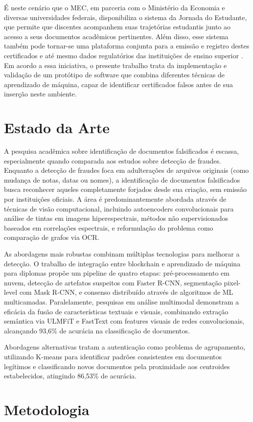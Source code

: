 \documentclass[12pt]{article}
\begin{document}
É neste cenário que o MEC, em parceria com o Ministério da Economia e diversas universidades federais, disponibiliza o sistema da Jornada do Estudante, que permite que discentes acompanhem suas trajetórias estudantis junto ao acesso a seus documentos acadêmicos pertinentes. Além disso, esse sistema também pode tornar-se uma plataforma conjunta para a emissão e registro destes certificados e até mesmo dados regulatórios das instituições de ensino superior \cite{rnp:2023}. Em acordo a essa iniciativa, o presente trabalho trata da implementação e validação de um protótipo de software que combina diferentes técnicas de aprendizado de máquina, capaz de identificar certificados falsos antes de sua inserção neste ambiente.

\section{Estado da Arte} \label{sec:firstpage}

A pesquisa acadêmica sobre identificação de documentos falsificados é escassa, especialmente quando comparada aos estudos sobre detecção de fraudes. Enquanto a detecção de fraudes foca em adulterações de arquivos originais (como mudança de notas, datas ou nomes), a identificação de documentos falsificados busca reconhecer aqueles completamente forjados desde sua criação, sem emissão por instituições oficiais. A área é predominantemente abordada através de técnicas de visão computacional, incluindo autoencoders convolucionais para análise de tintas em imagens hiperespectrais, métodos não supervisionados baseados em correlações espectrais, e reformulação do problema como comparação de grafos via OCR.

As abordagens mais robustas combinam múltiplas tecnologias para melhorar a detecção. O trabalho de integração entre blockchain e aprendizado de máquina para diplomas propõe um pipeline de quatro etapas: pré-processamento em nuvem, detecção de artefatos suspeitos com Faster R-CNN, segmentação pixel-level com Mask R-CNN, e consenso distribuído através de algoritmos de ML multicamadas. Paralelamente, pesquisas em análise multimodal demonstram a eficácia da fusão de características textuais e visuais, combinando extração semântica via ULMFiT e FastText com features visuais de redes convolucionais, alcançando 93,6\% de acurácia na classificação de documentos.

Abordagens alternativas tratam a autenticação como problema de agrupamento, utilizando K-means para identificar padrões consistentes em documentos legítimos e classificando novos documentos pela proximidade aos centroides estabelecidos, atingindo 86,53\% de acurácia.

\section{Metodologia}




\end{document}
